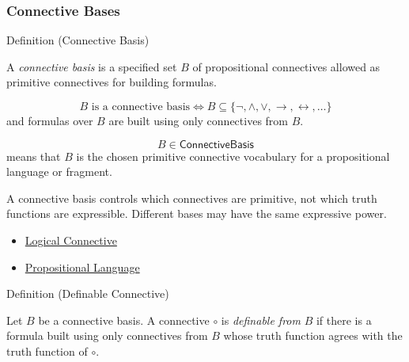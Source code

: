 \subsubsection*{Connective Bases}

\begin{definitionbox}{Definition (Connective Basis)}
\begin{definition}
\label{def:connective-basis-propositional-logic}
A \emph{connective basis} is a specified set \(B\) of propositional connectives
allowed as primitive connectives for building formulas.
\end{definition}
\end{definitionbox}

\begin{remark*}
\[
B\text{ is a connective basis}
\Longleftrightarrow
B\subseteq\{\neg,\land,\lor,\to,\leftrightarrow,\ldots\}
\]
and formulas over \(B\) are built using only connectives from \(B\).
\end{remark*}

\begin{remark*}
\[
  B\in\mathsf{ConnectiveBasis}
\] means that \(B\) is the chosen primitive
connective vocabulary for a propositional language or fragment.
\end{remark*}

\begin{remark*}[Interpretation]
A connective basis controls which connectives are primitive, not which truth
functions are expressible. Different bases may have the same expressive power.
\end{remark*}

\begin{dependencies}
\begin{itemize}
  \item \hyperref[def:logical-connective]{Logical Connective}
  \item \hyperref[def:propositional-language]{Propositional Language}
\end{itemize}
\end{dependencies}

\begin{definitionbox}{Definition (Definable Connective)}
\begin{definition}
\label{def:definable-connective-propositional-logic}
Let \(B\) be a connective basis. A connective \(\circ\) is \emph{definable from}
\(B\) if there is a formula built using only connectives from \(B\) whose truth
function agrees with the truth function of \(\circ\).
\end{definition}
\end{definitionbox}

